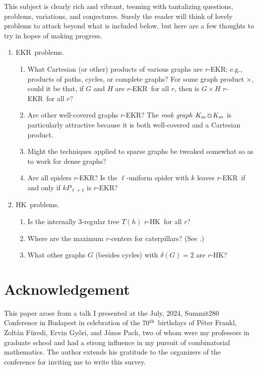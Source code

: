 \documentclass{article}
\def\d{{\delta}}
\def\ekr{{\sf EKR}}
\def\hk{{\sf HK}}
\def\sqr#1#2{{\vcenter{\hrule height.#2pt
        \hbox{\vrule width.#2pt height#1pt \kern#1pt
                \vrule width.#2pt}
        \hrule height.#2pt}}}
\def\gbox{{\mathchoice\sqr45\sqr45\sqr{2.1}3\sqr{1.5}3}}
\begin{document}
This subject is clearly rich and vibrant, teeming with tantalizing questions, problems, variations, and conjectures.
Surely the reader will think of lovely problems to attack beyond what is included below, but here are a few thoughts to try in hopes of making progress.

\begin{enumerate}
\item 
\ekr\ problems.
    \begin{enumerate}
    \item 
    What Cartesian (or other) products of various graphs are $r$-\ekr; e.g., products of paths, cycles, or complete graphs?
    For some graph product $\times$, could it be that, if $G$ and $H$ are $r$-\ekr\ for all $r$, then is $G\times H$ $r$-\ekr\ for all $r$?
    \item 
    Are other well-covered graphs $r$-\ekr?
    The {\it rook graph} $K_m\mathbin{\gbox} K_m$ is particularly attractive because it is both well-covered and a Cartesian product.
    \item 
    Might the techniques applied to sparse graphs be tweaked somewhat so as to work for dense graphs?
    \item 
    Are all spiders $r$-\ekr?
    Is the $\ell$-uniform spider with $k$ leaves $r$-\ekr\ if and only if $kP_{\ell+1}$ is $r$-\ekr?
    \end{enumerate}
\item 
\hk\ problems.
    \begin{enumerate}
    \item 
    Is the internally 3-regular tree $T(h)$ $r$-\hk\ for all $r$?
    \item 
    Where are the maximum $r$-centers for caterpillars?
    (See \cite{EstrPast}.)
    \item 
    What other graphs $G$ (besides cycles) with $\d(G)=2$ are $r$-\hk?
    \end{enumerate}
\end{enumerate}


\section*{Acknowledgement}

This paper arose from a talk I presented at the July, 2024, Summit280 Conference in Budapest in celebration of the $70^{\rm th}$ birthdays of P\'eter Frankl, Zolt\'an F\"uredi, Ervin Gy\H ori, and J\'anos Pach, two of whom were my professors in graduate school and had a strong influence in my pursuit of combinatorial mathematics.
The author extends his gratitude to the organizers of the conference for inviting me to write this survey.




\end{document}
